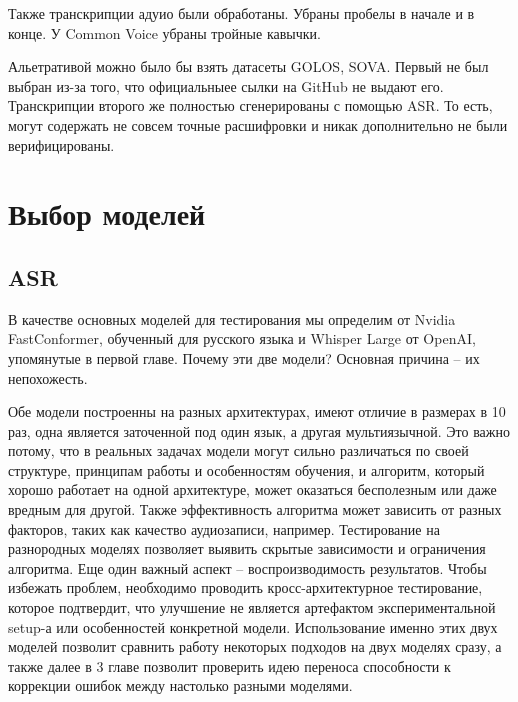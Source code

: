 Также транскрипции адуио были обработаны.
Убраны пробелы в начале и в конце.
У Common Voice убраны тройные кавычки.

Альетративой можно было бы взять датасеты GOLOS\cite{karpov2021golos}, SOVA\cite{sova2021rudevices}.
Первый не был выбран из-за того, что официальныее сылки на GitHub не выдают его.
Транскрипции второго же полностью сгенерированы с помощью ASR.
То есть, могут содержать не совсем точные расшифровки и никак дополнительно не были верифицированы.

\section{Выбор моделей}
\subsection{ASR}

В качестве основных моделей для тестирования мы определим от Nvidia FastConformer, обученный для русского языка и Whisper Large от OpenAI, упомянутые в первой главе.
Почему эти две модели? Основная причина -- их непохожесть.

Обе модели построенны на разных архитектурах, имеют отличие в размерах в 10 раз, одна является заточенной под один язык, а другая мультиязычной.
Это важно потому, что в реальных задачах модели могут сильно различаться по своей структуре, принципам работы и особенностям обучения, и алгоритм, который хорошо работает на одной архитектуре, может оказаться бесполезным или даже вредным для другой.
Также эффективность алгоритма может  зависить от разных факторов, таких как качество аудиозаписи, например.
Тестирование на разнородных моделях позволяет выявить скрытые зависимости и ограничения алгоритма.
Еще один важный аспект -- воспроизводимость результатов.
Чтобы избежать проблем, необходимо проводить кросс-архитектурное тестирование, которое подтвердит, что улучшение не является артефактом экспериментальной setup-а или особенностей конкретной модели.
Использование именно этих двух моделей позволит сравнить работу некоторых подходов на двух моделях сразу, а также далее в 3 главе позволит проверить идею переноса способности к коррекции ошибок между настолько разными моделями.

